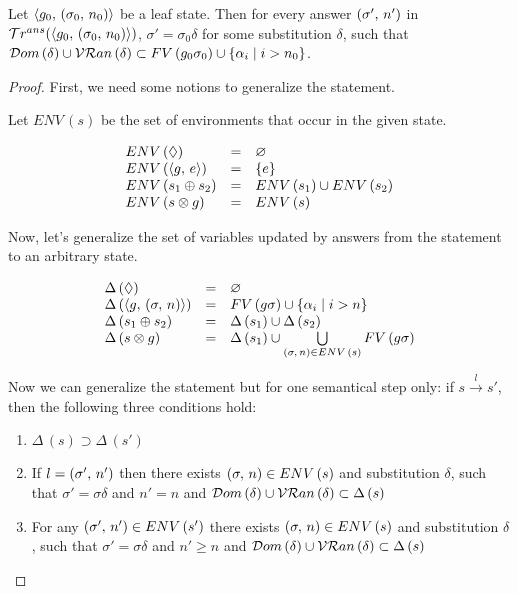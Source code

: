 \begin{lemma}
\label{lem:update_substitutions_FV}

Let $\langle g_0 ,\, (\sigma_0 ,\, n_0) \rangle$ be a leaf state. Then for every answer $(\sigma' ,\, n')$ in $\mathcal{T}r^{ans}(\langle g_0 ,\, (\sigma_0 ,\, n_0) \rangle)$, $\sigma' = \sigma_0 \delta$ for some substitution $\delta$, such that $\mathcal{D}om\,(\delta) \cup \mathcal{VR}an\,(\delta) \subset FV\,(g_0 \sigma_0) \cup \{ \alpha_i \mid i > n_0 \}$.

\end{lemma}
\begin{proof}

First, we need some notions to generalize the statement.

Let $ENV\,(s)$ be the set of environments that occur in the given state.

\[ \begin{array}{lcl}
ENV\,(\Diamond) & = & \varnothing \\
ENV\,(\langle g ,\, e \rangle) & = & \{ e \} \\
ENV\,(s_1 \oplus s_2) & = & ENV\,(s_1) \cup ENV\,(s_2) \\
ENV\,(s \otimes g) & = & ENV\,(s) 
\end{array} \]

Now, let's generalize the set of variables updated by answers from the statement to an arbitrary state.

\[ \begin{array}{lcl}
\Delta\,(\Diamond) & = & \varnothing \\
\Delta\,(\langle g ,\, (\sigma ,\, n) \rangle) & = & FV\,(g \sigma) \cup \{ \alpha_i \mid i > n \} \\
\Delta\,(s_1 \oplus s_2) & = & \Delta\,(s_1) \cup \Delta\,(s_2) \\
\Delta\,(s \otimes g) & = & \Delta\,(s_1) \cup \bigcup\limits_{(\sigma ,\, n) \in ENV\,(s)} FV\,(g \sigma)
\end{array} \]

Now we can generalize the statement but for one semantical step only: if $s \xrightarrow{l} s'$, then the following three conditions hold:

\begin{enumerate}
\item $\Delta\,(s) \supset \Delta\,(s')$
\item If $l = (\sigma' ,\, n')$ then there exists $(\sigma ,\, n) \in ENV\,(s)$ and substitution $\delta$, such that $\sigma' = \sigma \delta$ and $n' = n$ and $\mathcal{D}om\,(\delta) \cup \mathcal{VR}an\,(\delta) \subset \Delta\,(s)$
\item For any $(\sigma' ,\, n') \in ENV\,(s')$ there exists $(\sigma ,\, n) \in ENV\,(s)$ and substitution $\delta$, such that $\sigma' = \sigma \delta$ and $n' \ge n$ and $\mathcal{D}om\,(\delta) \cup \mathcal{VR}an\,(\delta) \subset \Delta\,(s)$
\end{enumerate}


\end{proof}
